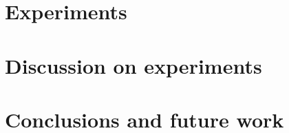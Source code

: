 \documentclass[12pt,a4paper,titlepage,twoside]{book}
\newcommand{\blankpage}{
\newpage \thispagestyle{empty}
\emph{  }
\newpage
}
\begin{document}
\chapter{Experiments} \label{ch:experiments}
  
	
\chapter{Discussion on experiments} \label{ch:discussion}
	 
\chapter{Conclusions and future work} \label{ch:concl}
  





\listoffigures 	%
\blankpage
\listoftables
\end{document}
